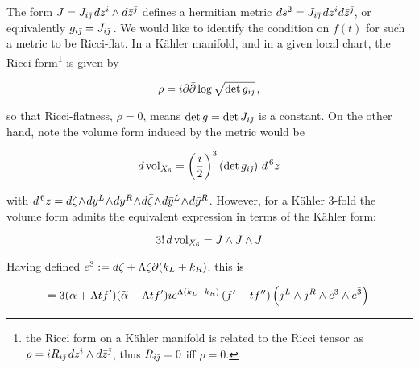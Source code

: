 \newcommand{\fibral}{e^3 \wedge \bar e^{\bar 3}}




The form $J = J_{i\bar{\jmath}}\, dz^i \wedge d\bar z^{\bar\jmath}$ defines a hermitian metric $ds^2 = J_{i\bar{\jmath}}\, dz^i d\bar z^{\bar\jmath}$, or equivalently $g_{i\bar{\jmath}} = J_{i\bar{\jmath}}\,$. We would like to identify the condition on $f(t)$ for such a metric to be Ricci-flat. In a K\"ahler manifold, and in a given local chart, the Ricci form\footnote{the Ricci form on a K\"ahler manifold is related to the Ricci tensor as $\rho = i R_{i\bar{\jmath}} \, dz^i \wedge d\bar z^{\bar\jmath}$, thus $R_{i\bar{\jmath}} = 0$ iff $\rho = 0$. } is given by \cite{Ballmann}

\begin{equation}
	\rho = i \partial \bar\partial \log \sqrt{ \det g_{i\bar{\jmath}}}\,,
	\label{}
\end{equation}

so that Ricci-flatness, $\rho = 0$, means $\det g = \det {J_{i\bar{\jmath}}}$ is a constant. On the other hand, note the volume form induced by the metric would be

\begin{equation}
	d\operatorname{vol}_{X_6} = \left(\frac{i}{2}\right)^3 \left(\det g_{i\bar{\jmath}}\right) \, d^{\,6} z
	\label{volumeintermsofmetric}
\end{equation}

with $d^{\,6} z = d\zeta \twedge dy^L \twedge dy^R \twedge d\bar \zeta \twedge d\bar y^L \twedge d\bar y^R$. However, for a K\"ahler $3$-fold the volume form admits the equivalent expression in terms of the K\"ahler form:

\begin{equation}
	3! \, d\operatorname{vol}_{X_6} = J\wedge J \wedge J 	\label{}
\end{equation}

Having defined $e^3 := d\zeta + \Lambda \zeta \partial (k_L + k_R)$, this is

\begin{equation}
	= 3 \AL \AR i e^{\lamkah} \left(f'+tf''\right) \left(j^L \wedge j^R \wedge \fibral \right)\,
	\label{}
\end{equation}

